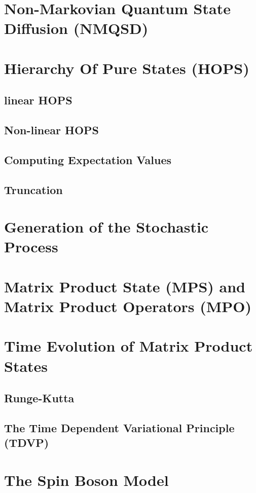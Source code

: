 \section{Non-Markovian Quantum State Diffusion (NMQSD)}

\section{Hierarchy Of Pure States (HOPS)}
\subsection{linear HOPS}

\subsection{Non-linear HOPS}

\subsection{Computing Expectation Values}

\subsection{Truncation}

\section{Generation of the Stochastic Process}

\section{Matrix Product State (MPS) and Matrix Product Operators (MPO)}

\section{Time Evolution of Matrix Product States}
\subsection{Runge-Kutta}
\subsection{The Time Dependent Variational Principle (TDVP)}
\section{The Spin Boson Model}
